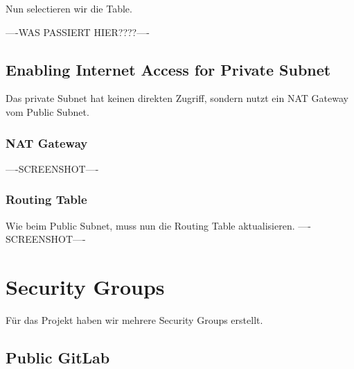 \documentclass[a4paper,12pt]{article}
\begin{document}
Nun selectieren wir die Table. 

----WAS PASSIERT HIER????----



\subsection{Enabling Internet Access for Private Subnet}
Das private Subnet hat keinen direkten Zugriff, sondern nutzt ein NAT Gateway vom Public Subnet.

\subsubsection{NAT Gateway}
----SCREENSHOT----

\subsubsection{Routing Table}
Wie beim Public Subnet, muss nun die Routing Table aktualisieren.
----SCREENSHOT----

\section{Security Groups}
Für das Projekt haben wir mehrere Security Groups erstellt.
\subsection{Public GitLab}
\begin{table}[h!]
	\centering
	\caption{Security Group: Public GitLab}
	\label{tab:sec-Group-GitLab-Public}
\end{table}
\end{document}
